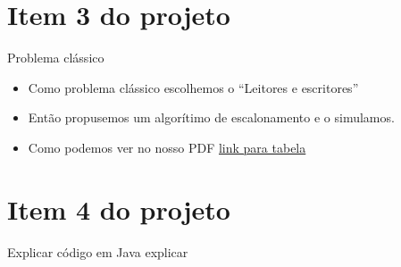 \documentclass{beamer}
\begin{document}
\section{Item 3 do projeto}
\begin{frame}{Problema clássico}
	\begin{itemize}
		\item Como problema clássico escolhemos o ``Leitores e escritores''\pause
		\item Então propusemos um algorítimo de escalonamento e o simulamos.

		\item Como podemos ver no nosso PDF \textcolor{cyan}{\href{https://github.com/arcanjolevi/projeto_1_so/blob/master/item_3/tabela.pdf}{link para tabela}}
	\end{itemize}
\end{frame}

\section{Item 4 do projeto}
\begin{frame}{Explicar código em Java}
	explicar
\end{frame}
\end{document}
